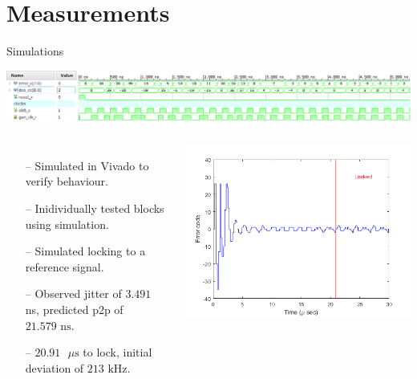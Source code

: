 \documentclass{beamer}
\begin{document}
\section*{Measurements}
\begin{frame}{Simulations}
	\vspace*{-10mm}
 	\begin{center}
 		\includegraphics[scale=0.33]{../vivado_sim}
 	\end{center}
	\begin{columns}
    \begin{itemize}
	    \item[--]
	        Simulated in Vivado to verify behaviour.
	    \item[--]
	        Inidividually tested blocks using simulation.
	    \item[--]
	        Simulated locking to a reference signal.
	    \item[--]
            Observed jitter of $3.491$ ns, predicted p2p of $21.579\textrm{ ns}$.
	    \item[--]
            $20.91\textrm{ }\mu\textrm{s}$ to lock, initial deviation of $213\textrm{ kHz}$.
	\end{itemize}
	
	\includegraphics[scale=0.4]{../sim_locking}
	\end{columns}

\end{frame}
\end{document}
